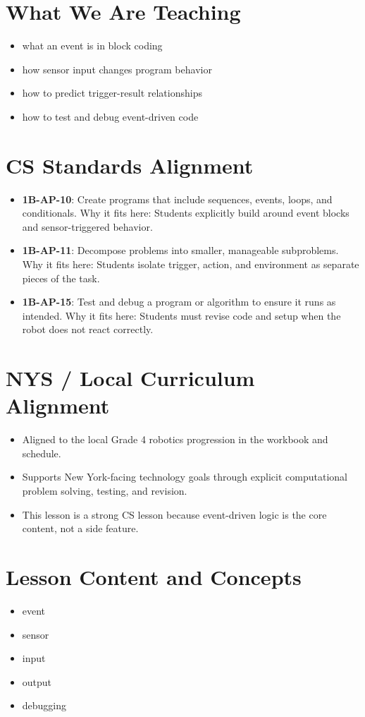 \documentclass[11pt]{article}
\begin{document}
\section*{What We Are Teaching}
\begin{itemize}[leftmargin=*]
\item what an event is in block coding
\item how sensor input changes program behavior
\item how to predict trigger-result relationships
\item how to test and debug event-driven code
\end{itemize}

\section*{CS Standards Alignment}
\begin{itemize}[leftmargin=*]
\item \textbf{1B-AP-10}: Create programs that include sequences, events, loops, and conditionals. Why it fits here: Students explicitly build around event blocks and sensor-triggered behavior.
\item \textbf{1B-AP-11}: Decompose problems into smaller, manageable subproblems. Why it fits here: Students isolate trigger, action, and environment as separate pieces of the task.
\item \textbf{1B-AP-15}: Test and debug a program or algorithm to ensure it runs as intended. Why it fits here: Students must revise code and setup when the robot does not react correctly.
\end{itemize}

\section*{NYS / Local Curriculum Alignment}
\begin{itemize}[leftmargin=*]
\item Aligned to the local Grade 4 robotics progression in the workbook and schedule.
\item Supports New York-facing technology goals through explicit computational problem solving, testing, and revision.
\item This lesson is a strong CS lesson because event-driven logic is the core content, not a side feature.
\end{itemize}

\section*{Lesson Content and Concepts}
\begin{itemize}[leftmargin=*]
\item event
\item sensor
\item input
\item output
\item debugging
\end{itemize}
\end{document}
